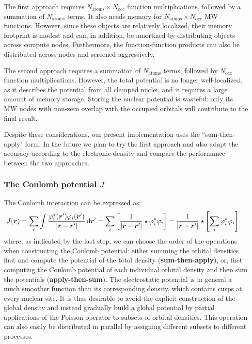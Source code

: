 \documentclass[journal=jctcce, manuscript=article]{achemso}
\begin{document}
The first approach requires $N_{\mathrm{atoms}}\times N_{\mathrm{occ}}$ function multiplications, followed by a summation of $N_{\mathrm{atoms}}$ terms. It also needs memory for $N_{\mathrm{atoms}}\times N_{\mathrm{occ}}$ \ac{MW} functions. However, since these objects are relatively localized, their memory footprint is modest and can, in addition, be amortized by distributing objects across compute nodes. Furthermore, the function-function products can also be distributed across nodes and screened aggressively.

The second approach requires a summation of $N_{\mathrm{atoms}}$ terms, followed by $N_{\mathrm{occ}}$ function multiplications. However, the total potential is no longer well-localized, as it describes the potential from all clamped nuclei, and it requires a large amount of memory storage. Storing the nuclear potential is wasteful: only its \ac{MW} nodes with non-zero overlap with the occupied orbitals will contribute to the final result.

Despite these considerations, our present implementation uses the ``sum-then-apply" form. In the future we plan to try the first approach and also adapt the accuracy according to the electronic density and compare the performance between the two approaches.


\subsubsection{The Coulomb potential $J$}\label{sec:compute-J}
The Coulomb interaction can be expressed as:
\begin{equation}
    \begin{aligned}
  J(\boldsymbol{r}) &= \sum_i \int \frac{\varphi^*_i(\boldsymbol{r}')\varphi_i(\boldsymbol{r}')}{|\boldsymbol{r}-\boldsymbol{r}'|} \, \mathrm{d}\boldsymbol{r}' =
  \sum_i  \left[
  \frac{1}{|\boldsymbol{r}-\boldsymbol{r}'|} \star 
  \varphi^*_i\varphi_i
  \right] =
  \frac{1}{|\boldsymbol{r}-\boldsymbol{r}'|} \star 
  \left[\sum_i 
  \varphi^*_i\varphi_i
  \right]
    \end{aligned}
\end{equation}
where, as indicated by the last step, we can choose the order of the operations when constructing the Coulomb potential: either summing the orbital densities first and compute the potential of the total density (\textbf{sum-then-apply}), or, first computing the Coulomb potential of each individual orbital density and then sum the potentials (\textbf{apply-then-sum}). The electrostatic potential is in general a much smoother function than its corresponding density, which contains cusps at every nuclear site. It is thus desirable to avoid the explicit construction of the global density and instead gradually build a global potential by partial applications of the Poisson operator to subsets of orbital densities. This operation can also easily be distributed in parallel by assigning different subsets to different processes.
\end{document}
